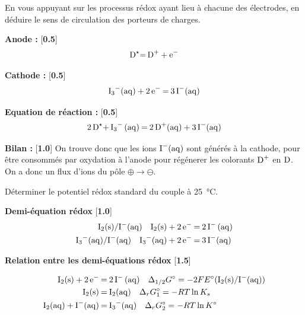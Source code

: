 \documentclass[twoside,a4paper,11pt,addpoints,answers]{exam}%
\newcounter{foo} %
\begin{document}
\begin{questions}


\setcounter{question}{\thefoo}

\question[2\half] En vous appuyant sur les processus rédox ayant lieu à chacune des électrodes, en déduire le sens de circulation des {\color{red} porteurs de charges.}

\begin{mybox}
\begin{solution}[5cm]

\textbf{Anode :} [\textbf{0.5}]
\begin{align*}
\ce{D^\star = D^+ + e^-}
\end{align*}

\textbf{Cathode :} [\textbf{0.5}]
\begin{align*}
\ce{I_3^-(aq) + 2e^- = 3I^-(aq)}
\end{align*}


\textbf{Equation de réaction :} [\textbf{0.5}]
\begin{align*}
\ce{2 D^\star {+} I_3^- (aq) = 2D^+(aq) + 3 I^-(aq)}
\end{align*}

\textbf{Bilan :} [\textbf{1.0}]
On trouve donc que les ions $\ce{I^-(aq)}$ sont générés à la cathode, pour être consommés par oxydation à l'anode pour régénerer les colorants $\ce{D^+}$ en $\ce{D}$. On a donc un flux d'ions  du pôle $\oplus \to \ominus$.

\end{solution}
\end{mybox}

\question[4] Déterminer le potentiel rédox standard du couple  à \SI{25}{\celsius}.

\begin{mybox}
\begin{solution}[5cm]

\textbf{Demi-équation rédox} [\textbf{1.0}]
\begin{align*}
\ce{I2(s)/I^-(aq)} \quad \ce{I2(s) + 2e^- &= 2 I^- (aq)} \\
\ce{I3^-(aq)/I^-(aq)} \quad \ce{I3^-(aq) + 2e^- &= 3 I^-(aq)}
\end{align*}

\textbf{Relation entre les demi-équations rédox} [\textbf{1.5}]

\begin{align*}
\ce{I2(s) + 2e^- &= 2 I^- (aq)} \quad \Delta_{1/2} G^\circ = -2 F E^\circ (\ce{I2(s)}/\ce{I^-(aq)}) \\
\ce{I2(s) &= I2(aq)} \quad \Delta_{r} G_1^\circ = -RT \ln K_s \\
\ce{I2(aq) + I^-(aq) &= I3^-(aq)} \quad \Delta_{r} G_2^\circ = -RT \ln K^\circ
\end{align*}


\end{solution}
\end{mybox}
\end{questions}
\end{document}

